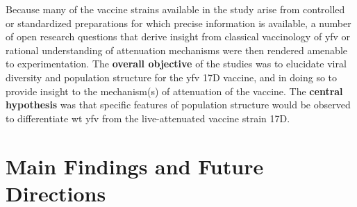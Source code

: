 Because many of the vaccine strains available in the study arise from controlled or standardized preparations for which precise information is available, a number of open research questions that derive insight from classical vaccinology of \gls{yfv} or rational understanding of attenuation mechanisms were then rendered amenable to experimentation. The \textbf{overall objective} of the studies was to elucidate viral diversity and population structure for the \gls{yfv} 17D vaccine, and in doing so to provide insight to the mechanism(s) of attenuation of the vaccine. The \textbf{central hypothesis} was that specific features of population structure would be observed to differentiate \gls{wt} \gls{yfv} from the live-attenuated vaccine strain 17D. 

\section{Main Findings and Future Directions}
